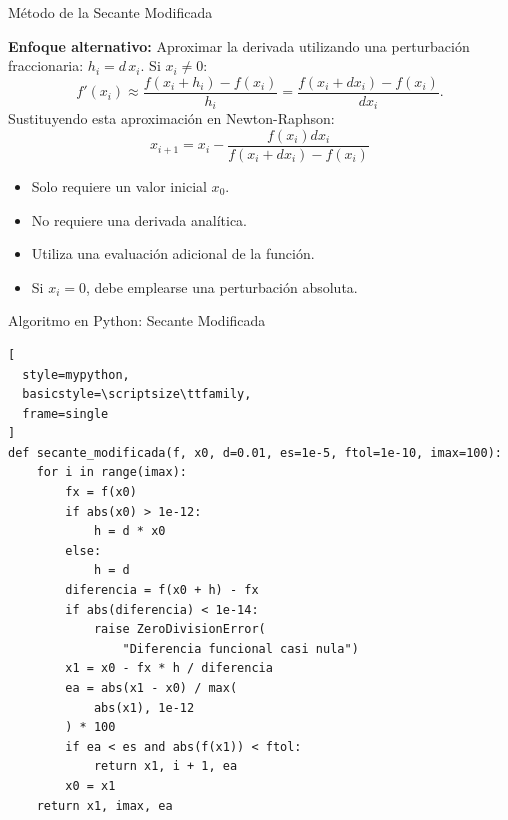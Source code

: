 \documentclass[../../main.tex]{subfiles}
\begin{document}

\begin{frame}{Método de la Secante Modificada}

\textbf{Enfoque alternativo:}
Aproximar la derivada utilizando una perturbación fraccionaria:
\(
h_i=d\,x_i.
\)
Si \(x_i\neq0\):
\[
f'(x_i)
\approx
\frac{f(x_i+h_i)-f(x_i)}{h_i}
=
\frac{f(x_i+d x_i)-f(x_i)}{d x_i}.
\]
Sustituyendo esta aproximación en Newton-Raphson:
\[
\boxed{
x_{i+1}
=
x_i
-
\frac{f(x_i)d x_i}
{f(x_i+d x_i)-f(x_i)}
}
\]
\begin{itemize}
  \item Solo requiere un valor inicial \(x_0\).
  \item No requiere una derivada analítica.
  \item Utiliza una evaluación adicional de la función.
  \item Si \(x_i=0\), debe emplearse una perturbación absoluta.
\end{itemize}

\end{frame}



\begin{frame}[fragile]{Algoritmo en Python: Secante Modificada}
\begin{lstlisting}[
  style=mypython,
  basicstyle=\scriptsize\ttfamily,
  frame=single
]
def secante_modificada(f, x0, d=0.01, es=1e-5, ftol=1e-10, imax=100):
    for i in range(imax):
        fx = f(x0)
        if abs(x0) > 1e-12:
            h = d * x0
        else:
            h = d
        diferencia = f(x0 + h) - fx
        if abs(diferencia) < 1e-14:
            raise ZeroDivisionError(
                "Diferencia funcional casi nula")
        x1 = x0 - fx * h / diferencia
        ea = abs(x1 - x0) / max(
            abs(x1), 1e-12
        ) * 100
        if ea < es and abs(f(x1)) < ftol:
            return x1, i + 1, ea
        x0 = x1
    return x1, imax, ea
\end{lstlisting}

\end{frame}


\end{document}

